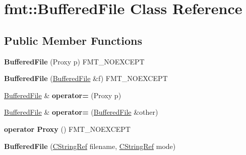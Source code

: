 \hypertarget{classfmt_1_1BufferedFile}{}\section{fmt\+:\+:Buffered\+File Class Reference}
\label{classfmt_1_1BufferedFile}
\subsection*{Public Member Functions}
\begin{DoxyCompactItemize}
\item 
{\bfseries Buffered\+File} (Proxy p) F\+M\+T\+\_\+\+N\+O\+E\+X\+C\+E\+PT\hypertarget{classfmt_1_1BufferedFile_a893b570968946b0f0f54c32a4c9742b6}{}\label{classfmt_1_1BufferedFile_a893b570968946b0f0f54c32a4c9742b6}

\item 
{\bfseries Buffered\+File} (\hyperlink{classfmt_1_1BufferedFile}{Buffered\+File} \&f) F\+M\+T\+\_\+\+N\+O\+E\+X\+C\+E\+PT\hypertarget{classfmt_1_1BufferedFile_a5bc528da7a6888f44a2f753cef3a7a09}{}\label{classfmt_1_1BufferedFile_a5bc528da7a6888f44a2f753cef3a7a09}

\item 
\hyperlink{classfmt_1_1BufferedFile}{Buffered\+File} \& {\bfseries operator=} (Proxy p)\hypertarget{classfmt_1_1BufferedFile_a03830cce82e5afbf2ddc39f3132db199}{}\label{classfmt_1_1BufferedFile_a03830cce82e5afbf2ddc39f3132db199}

\item 
\hyperlink{classfmt_1_1BufferedFile}{Buffered\+File} \& {\bfseries operator=} (\hyperlink{classfmt_1_1BufferedFile}{Buffered\+File} \&other)\hypertarget{classfmt_1_1BufferedFile_ad517d6edd8d0cff10e12abc7210431fc}{}\label{classfmt_1_1BufferedFile_ad517d6edd8d0cff10e12abc7210431fc}

\item 
{\bfseries operator Proxy} () F\+M\+T\+\_\+\+N\+O\+E\+X\+C\+E\+PT\hypertarget{classfmt_1_1BufferedFile_a54ffb69364af7d25bc8b19eb4e901ac5}{}\label{classfmt_1_1BufferedFile_a54ffb69364af7d25bc8b19eb4e901ac5}

\item 
{\bfseries Buffered\+File} (\hyperlink{classfmt_1_1BasicCStringRef}{C\+String\+Ref} filename, \hyperlink{classfmt_1_1BasicCStringRef}{C\+String\+Ref} mode)\hypertarget{classfmt_1_1BufferedFile_a5a2e3a0aabc752eb52993ea2488c95a8}{}\label{classfmt_1_1BufferedFile_a5a2e3a0aabc752eb52993ea2488c95a8}


\end{DoxyCompactItemize}
